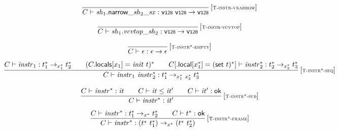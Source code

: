 $$
\begin{array}{@{}c@{}}\displaystyle
\frac{
}{
C \vdash {{\mathit{sh}}_1{.}\mathsf{narrow}}{\mathsf{\_}}{{\mathit{sh}}_2}{\mathsf{\_}}{{\mathit{sx}}} : \mathsf{v{\scriptstyle 128}}~\mathsf{v{\scriptstyle 128}} \rightarrow \mathsf{v{\scriptstyle 128}}
} \, {[\textsc{\scriptsize T{-}instr{-}vnarrow}]}
\qquad
\end{array}
$$

$$
\begin{array}{@{}c@{}}\displaystyle
\frac{
}{
C \vdash {\mathit{sh}}_1 {.} {{\mathit{vcvtop}}}{\mathsf{\_}}{{\mathit{sh}}_2} : \mathsf{v{\scriptstyle 128}} \rightarrow \mathsf{v{\scriptstyle 128}}
} \, {[\textsc{\scriptsize T{-}instr{-}vcvtop}]}
\qquad
\end{array}
$$

\vspace{1ex}

$$
\begin{array}{@{}c@{}}\displaystyle
\frac{
}{
C \vdash \epsilon : \epsilon \rightarrow \epsilon
} \, {[\textsc{\scriptsize T{-}instr*{-}empty}]}
\qquad
\end{array}
$$

$$
\begin{array}{@{}c@{}}\displaystyle
\frac{
C \vdash {\mathit{instr}}_1 : {t_1^\ast} \rightarrow_{{x_1^\ast}} {t_2^\ast}
 \qquad
(C{.}\mathsf{locals}{}[x_1] = {\mathit{init}}~t)^\ast
 \qquad
C{}[{.}\mathsf{local}{}[{x_1^\ast}] = {(\mathsf{set}~t)^\ast}] \vdash {{\mathit{instr}}_2^\ast} : {t_2^\ast} \rightarrow_{{x_2^\ast}} {t_3^\ast}
}{
C \vdash {\mathit{instr}}_1~{{\mathit{instr}}_2^\ast} : {t_1^\ast} \rightarrow_{{x_1^\ast}~{x_2^\ast}} {t_3^\ast}
} \, {[\textsc{\scriptsize T{-}instr*{-}seq}]}
\qquad
\end{array}
$$

$$
\begin{array}{@{}c@{}}\displaystyle
\frac{
C \vdash {{\mathit{instr}}^\ast} : {\mathit{it}}
 \qquad
C \vdash {\mathit{it}} \leq {\mathit{it}'}
 \qquad
C \vdash {\mathit{it}'} : \mathsf{ok}
}{
C \vdash {{\mathit{instr}}^\ast} : {\mathit{it}'}
} \, {[\textsc{\scriptsize T{-}instr*{-}sub}]}
\qquad
\end{array}
$$

$$
\begin{array}{@{}c@{}}\displaystyle
\frac{
C \vdash {{\mathit{instr}}^\ast} : {t_1^\ast} \rightarrow_{{x^\ast}} {t_2^\ast}
 \qquad
C \vdash {t^\ast} : \mathsf{ok}
}{
C \vdash {{\mathit{instr}}^\ast} : ({t^\ast}~{t_1^\ast}) \rightarrow_{{x^\ast}} ({t^\ast}~{t_2^\ast})
} \, {[\textsc{\scriptsize T{-}instr*{-}frame}]}
\qquad
\end{array}
$$

